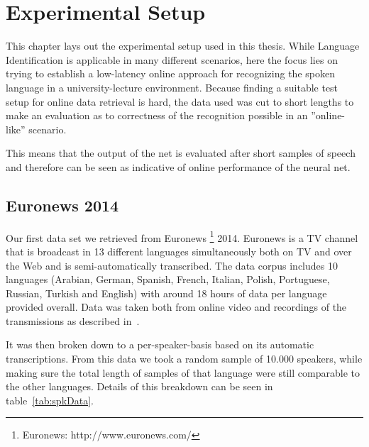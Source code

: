 



\chapter{Experimental Setup}
\label{ch:LITasks}
This chapter lays out the experimental setup used in this thesis. While Language Identification is applicable in many different scenarios, here the focus lies on trying to establish a low-latency online approach for recognizing the spoken language in a university-lecture environment. Because finding a suitable test setup for online data retrieval is hard, the data used was cut to short lengths to make an evaluation as to correctness of the recognition possible in an ''online-like'' scenario. 

This means that the output of the net is evaluated after short samples of speech and therefore can be seen as indicative of online performance of the neural net.

\section{Euronews 2014}
\label{sec:LITasks:Euronews}

Our first data set we retrieved from Euronews \footnote{Euronews: http://www.euronews.com/} 2014. Euronews is a TV channel that is broadcast in 13 different languages simultaneously both on TV and over the Web and is semi-automatically transcribed. The data corpus includes 10 languages (Arabian, German, Spanish, French, Italian, Polish, Portuguese, Russian, Turkish and English) with around 18 hours of data per language provided overall. Data was taken both from online video and recordings of the transmissions as described in~\cite{gretter2014euronews}.

It was then broken down to a per-speaker-basis based on its automatic transcriptions. From this data we took a random sample of 10.000 speakers, while making sure the total length of samples of that language were still comparable to the other languages. Details of this breakdown can be seen in table~\ref{tab:spkData}.

